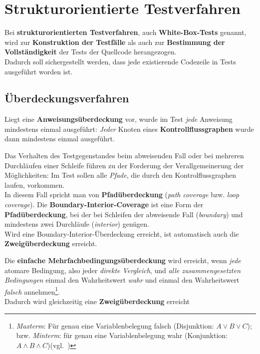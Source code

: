 \section{Strukturorientierte Testverfahren}

\begin{tcolorbox}
    Bei \textbf{strukturorientierten Testverfahren}, auch \textbf{White-Box-Tests} genannt, wird zur \textbf{Konstruktion der Testfälle} als auch zur \textbf{Bestimmung der Vollständigkeit} der Tests der Quellcode herangezogen.\\
    Dadurch soll sichergestellt werden, dass jede existierende Codezeile in Tests ausgeführt worden ist.
\end{tcolorbox}


\subsection*{Überdeckungsverfahren}

\begin{tcolorbox}[title=Anweisungsüberdeckung]
    Liegt eine \textbf{Anweisungsüberdeckung} vor, wurde im Test \textit{jede} Anweisung mindestens einmal ausgeführt: \textit{Jeder} Knoten eines \textbf{Kontrollflussgraphen} wurde dann mindestens einmal ausgeführt.
\end{tcolorbox}



\begin{tcolorbox}[title=Boundary-Interior-Coverage]
    Das Verhalten des Testgegenstandes beim abweisenden Fall oder bei mehreren Durchläufen einer Schleife führen zu der Forderung der Verallgemeinerung der Möglichkeiten: Im Test sollen alle \textit{Pfade}, die durch den Kontrolflussgraphen laufen, vorkommen.\\
    In diesem Fall spricht man von \textbf{Pfadüberdeckung} (\textit{path coverage} bzw. \textit{loop coverage}).
    Die \textbf{Boundary-Interior-Coverage} ist eine Form der \textbf{Pfadüberdeckung}, bei der bei Schleifen der abweisende Fall (\textit{boundary}) und mindestens zwei Durchläufe (\textit{interior}) genügen.\\
    Wird eine Boundary-Interior-Überdeckung erreicht, ist automatisch auch die \textbf{Zweigüberdeckung} erreicht.
\end{tcolorbox}

\begin{tcolorbox}[title=Einfache Mehrfachbedingungsüberdeckung]
    Die \textbf{einfache Mehrfachbedingungsüberdeckung} wird erreicht, wenn \textit{jede} atomare Bedingung, also jeder \textit{direkte Vergleich}, und \textit{alle zusammengesetzten Bedingungen} einmal den Wahrheitswert \textit{wahr} und einmal den Wahrheitswert \textit{falsch} annehmen\footnote{
        \textit{Maxterm}: Für genau eine Variablenbelegung falsch (Disjunktion: $A \lor B \lor C$); bzw. \textit{Minterm}: für genau eine Variablenbelegung wahr (Konjunktion: $A \land B \land C$)(vgl.~\cite[92]{Hof22})
    }.\\
    Dadurch wird gleichzeitig eine \textbf{Zweigüberdeckung} erreicht
\end{tcolorbox}

